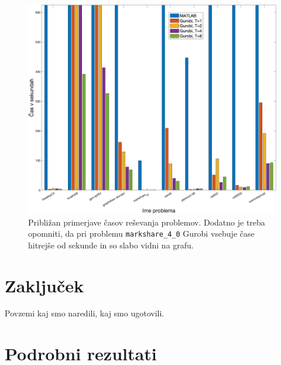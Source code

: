 \documentclass[a4paper,11pt]{article}
\begin{document}
\begin{figure}[htpb]
	\centering
	\includegraphics[width=\textwidth]{images/benchmark_times_zoom.png}
	\caption{Približan primerjave časov reševanja problemov. Dodatno je treba opomniti, da pri problemu \texttt{markshare\_4\_0} Gurobi vsebuje čase hitrejše od sekunde in so slabo vidni na grafu.}
	\label{img:bench_times_zoom}
\end{figure}

\section{Zaključek}
Povzemi kaj smo naredili, kaj smo ugotovili.

\appendix
\appendixpage
\section{\label{app-res}Podrobni rezultati}



\end{document}
